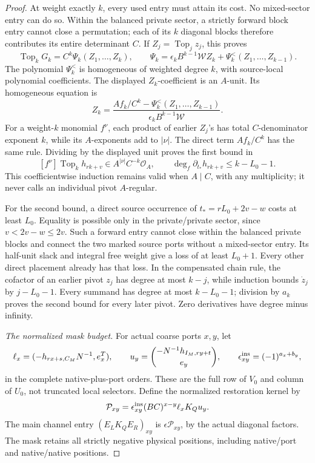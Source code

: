 \documentclass[11pt,a4paper]{amsart}
\numberwithin{equation}{section}
\theoremstyle{plain}
\theoremstyle{definition}
\begin{document}
\begin{proof}
At weight exactly \(k\), every used entry must attain its cost.
No mixed-sector entry can do so.  Within the balanced private sector,
a strictly forward block entry cannot close a permutation; each
of its \(k\) diagonal blocks therefore contributes its entire
determinant \(C\).  If \(Z_j=\operatorname{Top}_jz_j\), this proves
\[
 \operatorname{Top}_kG_k=C^k\Psi_k(Z_1,\ldots,Z_k),\qquad
 \Psi_k=\epsilon_k B^{k-1}\mathcal W Z_k+
                  \Psi_k^{<}(Z_1,\ldots,Z_{k-1}).
\]
The polynomial \(\Psi_k^{<}\) is homogeneous of weighted degree
\(k\), with source-local polynomial coefficients.  The displayed
\(Z_k\)-coefficient is an \(A\)-unit.  Its homogeneous equation is
\[
 Z_k=\frac{Af_k/C^k-\Psi_k^{<}(Z_1,\ldots,Z_{k-1})}
                    {\epsilon_k B^{k-1}\mathcal W}.
\]
For a weight-\(k\) monomial \(f^\nu\), each product of earlier
\(Z_j\)'s has total \(C\)-denominator exponent \(k\), while its
\(A\)-exponents add to \(|\nu|\).  The direct term \(Af_k/C^k\)
has the same rule.  Dividing by the displayed unit proves the first
bound in
\begin{equation}\label{rt:principal-pivot-budget}
 [f^\nu]\operatorname{Top}_k h_{rk+v}
       \in A^{|\nu|}C^{-k}\mathcal O_A,\qquad
 \deg_f\partial_{t_*}h_{rk+v}\le k-L_0-1.
\end{equation}
This coefficientwise induction remains valid when \(A\mid C\),
with any multiplicity; it never calls an individual pivot \(A\)-regular.

For the second bound, a direct source occurrence of
\(t_*=rL_0+2v-w\) costs at least \(L_0\).
Equality is possible only in the private/private sector, since
\(v<2v-w\le2v\).  Such a forward entry cannot close within the
balanced private blocks and connect the two marked source ports
without a mixed-sector entry.  Its half-unit slack and integral
free weight give a loss of at least \(L_0+1\).
Every other direct placement already has that loss.
In the compensated chain rule, the cofactor of an earlier pivot
\(z_j\) has degree at most \(k-j\), while induction bounds
\(\dot z_j\) by \(j-L_0-1\).
Every summand has degree at most \(k-L_0-1\);
division by \(a_k\) proves the second bound for every later pivot.
Zero derivatives have degree minus infinity.

\smallskip\noindent\emph{The normalized mask budget.}
For actual coarse ports \(x,y\), let
\[
 \ell_x=(-h_{rx+s,C_M}N^{-1},e_x^T),\qquad
 u_y=\binom{-N^{-1}h_{I_M,ry+t}}{e_y},\qquad
 \epsilon^{\rm ins}_{xy}=(-1)^{a_x+b_y},
\]
in the complete native-plus-port orders.  These are the full row of
\(V_0\) and column of \(U_0\), not truncated local selectors.
Define the normalized restoration kernel by
\[
 \mathcal P_{xy}
   =\epsilon^{\rm ins}_{xy}(BC)^{x-y}\ell_xK_Qu_y.
\]
The main channel entry \((E_LK_QE_R)_{xy}\) is
\(\epsilon\mathcal P_{xy}\), by the actual diagonal factors.
The mask retains all strictly negative physical positions, including
native/port and native/native positions.


\end{proof}
\end{document}
